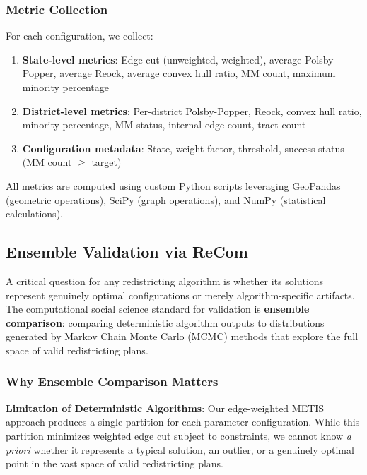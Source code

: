 \subsubsection{Metric Collection}

For each configuration, we collect:
\begin{enumerate}
    \item \textbf{State-level metrics}: Edge cut (unweighted, weighted), average Polsby-Popper, average Reock, average convex hull ratio, MM count, maximum minority percentage
    \item \textbf{District-level metrics}: Per-district Polsby-Popper, Reock, convex hull ratio, minority percentage, MM status, internal edge count, tract count
    \item \textbf{Configuration metadata}: State, weight factor, threshold, success status (MM count $\geq$ target)
\end{enumerate}

All metrics are computed using custom Python scripts leveraging GeoPandas (geometric operations), SciPy (graph operations), and NumPy (statistical calculations).

\subsection{Ensemble Validation via ReCom}

A critical question for any redistricting algorithm is whether its solutions represent genuinely optimal configurations or merely algorithm-specific artifacts. The computational social science standard for validation is \textbf{ensemble comparison}: comparing deterministic algorithm outputs to distributions generated by Markov Chain Monte Carlo (MCMC) methods that explore the full space of valid redistricting plans.

\subsubsection{Why Ensemble Comparison Matters}

\textbf{Limitation of Deterministic Algorithms}: Our edge-weighted METIS approach produces a single partition for each parameter configuration. While this partition minimizes weighted edge cut subject to constraints, we cannot know \emph{a priori} whether it represents a typical solution, an outlier, or a genuinely optimal point in the vast space of valid redistricting plans.

